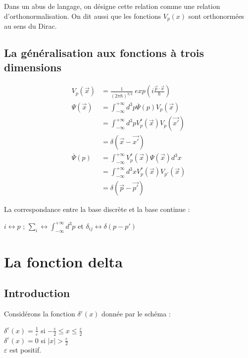\documentclass[12pt,a4paper,titlepage]{book}
\begin{document}
Dans un abus de langage, on désigne cette relation comme une relation d'orthonormalisation. On dit aussi que les fonctions $V_p (x)$ sont orthonormées au sens du Dirac.

\subsection{La généralisation aux fonctions à trois dimensions}

\begin{align*}
V_p (\overrightarrow{x}) &= \frac{1}{(2 \pi \hbar)^{3/2}} ~exp \left( i \frac{\overrightarrow{p} \cdot \overrightarrow{x}}{\hbar} \right)\\
\Psi (\overrightarrow{x}) &= \int_{- \infty}^{+ \infty} d^3 p \overline{\Psi} (p) V_p (\overrightarrow{x})\\
&= \int_{- \infty}^{+ \infty} d^3 p V_p^* (\overrightarrow{x}) V_p (\overrightarrow{x'})\\
&= \delta (\overrightarrow{x} - \overrightarrow{x'})\\
\overline{\Psi} (p) &= \int_{- \infty}^{+ \infty} V_p^* (\overrightarrow{x}) \Psi (\overrightarrow{x}) d^3 x\\
&= \int_{- \infty}^{+ \infty} d^3 x V_p^* (\overrightarrow{x}) V_{p'} (\overrightarrow{x})\\
&= \delta (\overrightarrow{p} - \overrightarrow{p'})
\end{align*}

La correspondance entre la base discrète et la base continue :
\begin{center}
$i \longleftrightarrow p$ ; $\sum\limits_i \longleftrightarrow \int_{- \infty}^{+ \infty} d^3 p$ et $\delta_{ij} \longleftrightarrow \delta (p-p')$
\end{center}

\section{La fonction delta}

\subsection{Introduction}

Considérons la fonction $\delta^{\varepsilon} (x)$ donnée par le schéma :


\begin{center}
$\delta^{\varepsilon} (x) = \frac{1}{\varepsilon}$ si $-\frac{\varepsilon}{2} \leq x \leq \frac{\varepsilon}{2}$\\
$\delta^{\varepsilon} (x) = 0$ si $\vert x \vert > \frac{\varepsilon}{2}$\\
$\varepsilon$ est positif.
\end{center}
\end{document}
